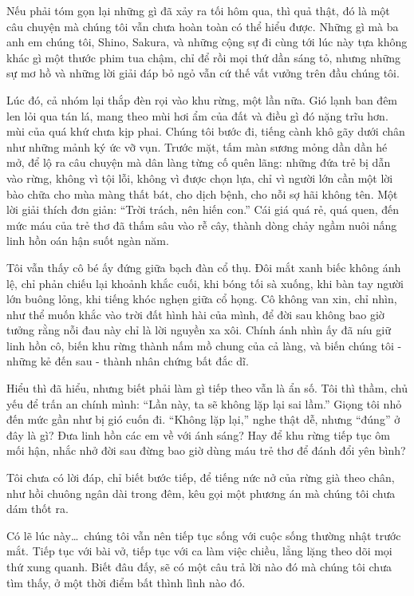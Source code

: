 \documentclass[../main.tex]{subfiles}
\begin{document}

Nếu phải tóm gọn lại những gì đã xảy ra tối hôm qua, thì quả thật, đó là một câu chuyện mà chúng tôi vẫn chưa hoàn toàn có thể hiểu được. Những gì mà ba anh em chúng tôi, Shino, Sakura, và những cộng sự đi cùng tới lúc này tựa không khác gì một thước phim tua chậm, chỉ để rồi mọi thứ dần sáng tỏ, nhưng những sự mơ hồ và những lời giải đáp bỏ ngỏ vẫn cứ thế vất vưởng trên đầu chúng tôi.

Lúc đó, cả nhóm lại thắp đèn rọi vào khu rừng, một lần nữa. Gió lạnh ban đêm len lỏi qua tán lá, mang theo mùi hơi ẩm của đất và điều gì đó nặng trĩu hơn. mùi của quá khứ chưa kịp phai. Chúng tôi bước đi, tiếng cành khô gãy dưới chân như những mảnh ký ức vỡ vụn. Trước mặt, tấm màn sương mỏng dần dần hé mở, để lộ ra câu chuyện mà dân làng từng cố quên lãng: những đứa trẻ bị dẫn vào rừng, không vì tội lỗi, không vì được chọn lựa, chỉ vì người lớn cần một lời bào chữa cho mùa màng thất bát, cho dịch bệnh, cho nỗi sợ hãi không tên. Một lời giải thích đơn giản: ``Trời trách, nên hiến con.'' Cái giá quá rẻ, quá quen, đến mức máu của trẻ thơ đã thấm sâu vào rễ cây, thành dòng chảy ngầm nuôi nấng linh hồn oán hận suốt ngàn năm.

Tôi vẫn thấy cô bé ấy đứng giữa bạch đàn cổ thụ. Đôi mắt xanh biếc không ánh lệ, chỉ phản chiếu lại khoảnh khắc cuối, khi bóng tối sà xuống, khi bàn tay người lớn buông lỏng, khi tiếng khóc nghẹn giữa cổ họng. Cô không van xin, chỉ nhìn, như thể muốn khắc vào trời đất hình hài của mình, để đời sau không bao giờ tưởng rằng nỗi đau này chỉ là lời nguyền xa xôi. Chính ánh nhìn ấy đã níu giữ linh hồn cô, biến khu rừng thành nấm mồ chung của cả làng, và biến chúng tôi - những kẻ đến sau - thành nhân chứng bất đắc dĩ.

Hiểu thì đã hiểu, nhưng biết phải làm gì tiếp theo vẫn là ẩn số. Tôi thì thầm, chủ yếu để trấn an chính mình: ``Lần này, ta sẽ không lặp lại sai lầm.'' Giọng tôi nhỏ đến mức gần như bị gió cuốn đi. ``Không lặp lại,'' nghe thật dễ, nhưng ``đúng'' ở đây là gì? Đưa linh hồn các em về với ánh sáng? Hay để khu rừng tiếp tục ôm mối hận, nhắc nhở đời sau đừng bao giờ dùng máu trẻ thơ để đánh đổi yên bình?

Tôi chưa có lời đáp, chỉ biết bước tiếp, để tiếng nức nở của rừng già theo chân, như hồi chuông ngân dài trong đêm, kêu gọi một phương án mà chúng tôi chưa dám thốt ra.

Có lẽ lúc này\dots\ chúng tôi vẫn nên tiếp tục sống với cuộc sống thường nhật trước mắt. Tiếp tục với bài vở, tiếp tục với ca làm việc chiều, lẳng lặng theo dõi mọi thứ xung quanh. Biết đâu đấy, sẽ có một câu trả lời nào đó mà chúng tôi chưa tìm thấy, ở một thời điểm bất thình lình nào đó.
\end{document}
